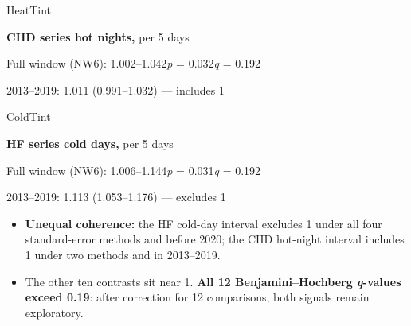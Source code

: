 \documentclass[12pt]{article}
\newcommand{\body}{\fontsize{26}{33}\selectfont}
\begin{document}
\vspace{3mm}
\noindent\begin{minipage}[t]{0.40\linewidth}
\begin{callout}{HeatTint}
\begin{minipage}[c]{0.28\linewidth}\centering
{\color{Heat}\bfseries\fontsize{46}{52}\par}
\end{minipage}\hfill\begin{minipage}[c]{0.68\linewidth}
{\fontsize{20}{25}\selectfont\textbf{CHD series \texttimes{} hot nights,} per 5 days\par}
\vspace{1.2mm}
{\fontsize{17.5}{22}\selectfont\color{Slate}Full window (NW6): 1.002--1.042\quad \textit{p} = 0.032\quad \textit{q} = 0.192\par}
\vspace{0.8mm}
{\fontsize{17.5}{22}\selectfont\color{Slate}2013--2019: 1.011 (0.991--1.032) --- includes 1\par}
\end{minipage}
\end{callout}
\end{minipage}\hfill\begin{minipage}[t]{0.57\linewidth}
\begin{callout}{ColdTint}
\begin{minipage}[c]{0.26\linewidth}\centering
{\color{Cold}\bfseries\fontsize{52}{58}\par}
\end{minipage}\hfill\begin{minipage}[c]{0.70\linewidth}
{\fontsize{21}{26}\selectfont\textbf{HF series \texttimes{} cold days,} per 5 days\par}
\vspace{1.2mm}
{\fontsize{18}{23}\selectfont\color{Slate}Full window (NW6): 1.006--1.144\quad \textit{p} = 0.031\quad \textit{q} = 0.192\par}
\vspace{0.8mm}
{\fontsize{18}{23}\selectfont\color{Slate}2013--2019: 1.113 (1.053--1.176) --- excludes 1\par}
\end{minipage}
\end{callout}
\end{minipage}

\vspace{3mm}
\body
\begin{itemize}
  \item \textbf{Unequal coherence:} the HF cold-day interval excludes 1 under all
        four standard-error methods and before 2020; the CHD hot-night interval
        includes 1 under two methods and in 2013--2019.
  \item The other ten contrasts sit near 1. \textbf{All 12 Benjamini--Hochberg
        \textit{q}-values exceed 0.19}: after correction for 12 comparisons,
        both signals remain exploratory.
\end{itemize}
\end{document}
